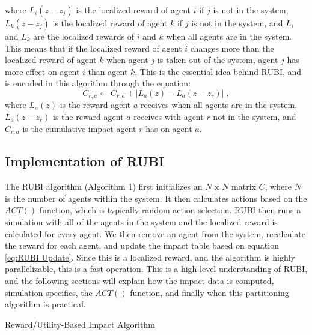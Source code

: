 \documentclass[letterpaper]{article}
\begin{document}
where $L_i(z-z_j)$ is the localized reward of agent $i$ if $j$ is not in the system, $L_k(z-z_j)$ is the localized reward of agent $k$ if $j$ is not in the system, and $L_i$ and $L_k$ are the localized rewards of $i$ and $k$ when all agents are in the system. This means that if the localized reward of agent $i$ changes more than the localized reward of agent $k$ when agent $j$ is taken out of the system, agent $j$ has more effect on agent $i$ than agent $k$. This is the essential idea behind RUBI, and is encoded in this algorithm through the equation:
%
\begin{equation} \label{eq:RUBI Update}
C_{r,a} \leftarrow C_{r,a} + |L_a(z) - L_a(z-z_r) | \;,
\end{equation}
%
where $L_a(z)$ is the reward agent $a$ receives when all agents are in the system, $L_a(z-z_r)$ is the reward agent $a$ receives with agent $r$ not in the system, and $C_{r,a}$ is the cumulative impact agent $r$ has on agent $a$.

\subsection{Implementation of RUBI}
The RUBI algorithm (Algorithm 1) first initializes an $N$ x $N$ matrix $C$, where $N$ is the number of agents within the system. It then calculates actions based on the $ACT()$ function, which is typically random action selection. RUBI then runs a simulation with all of the agents in the system and the localized reward is calculated for every agent. We then remove an agent from the system, recalculate the reward for each agent, and update the impact table based on equation \ref{eq:RUBI Update}. Since this is a localized reward, and the algorithm is highly parallelizable, this is a fast operation. This is a high level understanding of RUBI, and the following sections will explain how the impact data is computed, simulation specifics, the $ACT()$ function, and finally when this partitioning algorithm is practical.

\begin{algorithm} \label{alg:RUBI}
  \caption{Reward/Utility-Based Impact Algorithm}
  \begin{algorithmic}[1]
    \Statex
				\EndFor
		\EndFor
	\EndFor        
    \EndFunction
  \end{algorithmic}
\end{algorithm}
\end{document}
